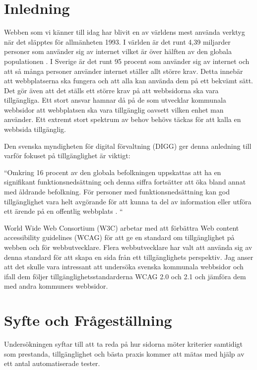\documentclass[11p]{article}
\begin{document}
    \tableofcontents

    \setlength{\parindent}{0pt}
    \setlength{\parskip}{10pt}

    
    \section{Inledning}
    Webben som vi känner till idag har blivit en av världens mest använda verktyg när det släpptes för allmänheten 1993.
    I världen är det runt 4,39 miljarder personer som använder sig av internet vilket är över hälften av den globala populationen \textcite{history_WWW}.
    I Sverige är det runt 95 procent som använder sig av internet \textcite{SCB} och att så många personer använder internet ställer allt större krav.
    Detta innebär att webbplatserna ska fungera och att alla kan använda dem på ett bekvämt sätt.
    Det gör även att det ställs ett större krav på att webbsidorna ska vara tillgängliga.
    Ett stort ansvar hamnar då på de som utvecklar kommunala webbsidor att webbplatsen ska vara tillgänglig oavsett vilken enhet man använder.
    Ett extremt stort spektrum av behov behövs täckas för att kalla en webbsida tillgänglig.

    Den svenska myndigheten för digital förvaltning (DIGG) ger denna anledning till varför fokuset på tillgänglighet är viktigt:

    ``Omkring 16 procent av den globala befolkningen uppskattas att ha en signifikant funktionsnedsättning och denna siffra fortsätter att öka bland annat med åldrande befolkning.
    För personer med funktionsnedsättning kan god tillgänglighet vara helt avgörande för att kunna ta del av information eller utföra ett ärende på en offentlig webbplats \textcite{Digg_tillganglighet}.
    ``

    World Wide Web Consortium (W3C) arbetar med att förbättra Web content accessibility guidelines (WCAG) för att ge en standard om tillgänglighet på webben och för webbutvecklare.
    Flera webbutvecklare har valt att använda sig av denna standard för att skapa en sida från ett tillgänglighets perspektiv.
    Jag anser att det skulle vara intressant att undersöka svenska kommunala webbsidor och ifall dem följer tillgänglighetsstandarderna WCAG 2.0 och 2.1 och jämföra dem med andra kommuners webbsidor.
    
    \section{Syfte och Frågeställning}
    Undersökningen syftar till att ta reda på hur sidorna möter kriterier samtidigt som prestanda, tillgänglighet och bästa praxis kommer att mätas med hjälp av ett antal automatiserade tester.
\end{document}
